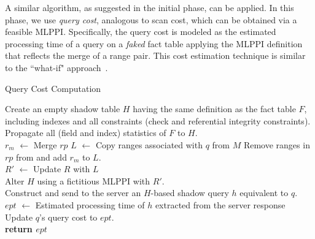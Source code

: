 \documentclass[runningheads]{comsis2}
\begin{document}
A similar algorithm, as suggested in the initial phase, 
can be applied. 
In this phase, we use {\em query cost}, analogous to scan cost, 
which can be obtained via a feasible MLPPI. 
Specifically, the query cost is modeled as the estimated processing time 
of a query on a {\it faked} fact table applying the MLPPI definition that reflects the merge of a range pair. 
This cost estimation technique is similar 
to the ``\hbox{what-if}" approach~\cite{chaudhuri1998autoadmin}.

\begin{algorithm}[t]
\caption{Query Cost Computation}
\label{algo:comp_query_cost}
{
	Create an empty shadow table $H$ having the same definition as the fact table $F$, 
	including indexes and all constraints (check and referential integrity constraints). \\
	Propagate all (field and index) statistics of $F$ to $H$. \\
	$r_{m}$ $\leftarrow$ Merge $rp$ \;
	$L$ $\leftarrow$ Copy ranges associated with $q$ from $M$\; 
	Remove ranges in $rp$ from and add $r_{m}$ to $L$. \\
	$R'$ $\leftarrow$ Update $R$ with $L$ \\
	Alter $H$ using a fictitious MLPPI with $R'$. \\
	Construct and send to the server an $H$-based shadow query $h$ equivalent to $q$. \\	
	$ept$ $\leftarrow$ Estimated processing time of $h$ extracted from the server response \;
	Update $q$'s query cost to $ept$. \\
	{\bf return $ept$} 
}
\end{algorithm}
\end{document}
